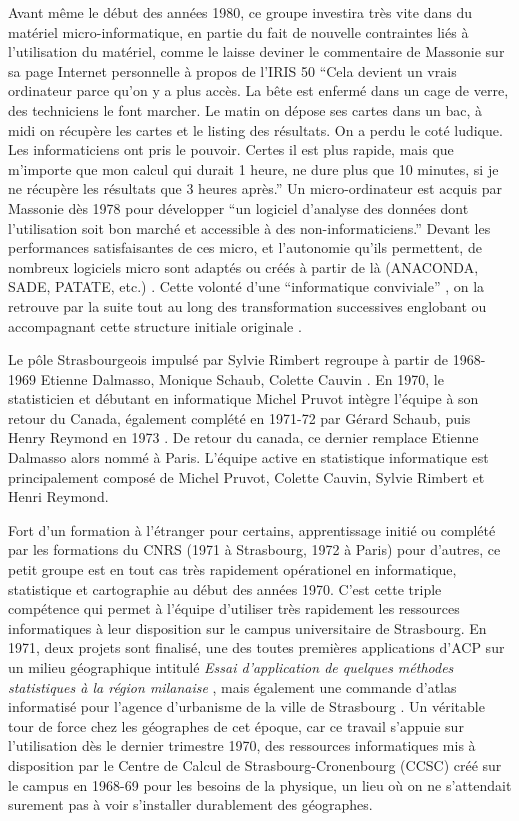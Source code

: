 Avant même le début des années 1980, ce groupe investira très vite dans du matériel micro-informatique, en partie du fait de nouvelle contraintes liés à l'utilisation du matériel, comme le laisse deviner le commentaire de Massonie sur sa page Internet personnelle à propos de l'IRIS 50 \enquote{Cela devient un vrais ordinateur parce qu'on y a plus accès. La bête est enfermé dans un cage de verre, des techniciens le font marcher. Le matin on dépose ses cartes dans un bac, à midi on récupère les cartes et le listing des résultats. On a perdu le coté ludique. Les informaticiens ont pris le pouvoir. Certes il est plus rapide, mais que m'importe que mon calcul qui durait 1 heure, ne dure plus que 10 minutes, si je ne récupère les résultats que 3 heures après.} Un micro-ordinateur est acquis par Massonie dès 1978 pour développer \enquote{un logiciel d'analyse des données dont l'utilisation soit bon marché et accessible à des non-informaticiens.} Devant les performances satisfaisantes de ces micro, et l'autonomie qu'ils permettent, de nombreux logiciels micro sont adaptés ou créés à partir de là (ANACONDA, SADE, PATATE, etc.) \autocite{Massonie1986}. Cette volonté d'une \enquote{informatique conviviale} \autocite{TSH1984}, on la retrouve par la suite tout au long des transformation successives englobant ou accompagnant cette structure initiale originale .

Le pôle Strasbourgeois impulsé par Sylvie Rimbert regroupe à partir de 1968-1969 Etienne Dalmasso, Monique Schaub, Colette Cauvin . En 1970, le statisticien et débutant en informatique Michel Pruvot intègre l'équipe à son retour du Canada, également complété en 1971-72 par Gérard Schaub, puis Henry Reymond en 1973 \autocite[135-153]{Cuyala2014}. De retour du canada, ce dernier remplace Etienne Dalmasso alors nommé à Paris. L'équipe active en statistique informatique est principalement composé de Michel Pruvot, Colette Cauvin, Sylvie Rimbert et Henri Reymond. 

Fort d'un formation à l'étranger pour certains, apprentissage initié ou complété par les formations du CNRS (1971 à Strasbourg, 1972 à Paris) pour d'autres, ce petit groupe est en tout cas très rapidement opérationel en informatique, statistique et cartographie au début des années 1970. C'est cette triple compétence qui permet à l'équipe d'utiliser très rapidement les ressources informatiques à leur disposition sur le campus universitaire de Strasbourg. En 1971, deux projets sont finalisé, une des toutes premières applications d’ACP sur un milieu géographique intitulé \textit{Essai d’application de quelques méthodes statistiques à la région milanaise} \autocite{Dalmasso1971}, mais également une commande d'atlas informatisé pour l'agence d'urbanisme de la ville de Strasbourg . Un véritable tour de force chez les géographes de cet époque, car ce travail s'appuie sur l'utilisation dès le dernier trimestre 1970, des ressources informatiques mis à disposition par le Centre de Calcul de Strasbourg-Cronenbourg (CCSC) créé sur le campus en 1968-69 pour les besoins de la physique, un lieu où on ne s'attendait surement pas à voir s'installer durablement des géographes. 

